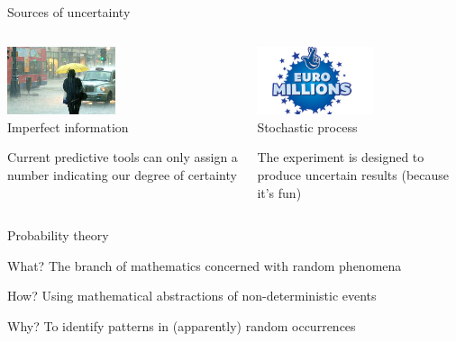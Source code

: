 \begin{frame}{Sources of uncertainty}
    \begin{columns}[t]
        \begin{column}{0.5\textwidth}
            \begin{center}
                \includegraphics[height=2cm]{figures/rain} \\[\medskipamount]
                \alert{Imperfect information}
            \end{center}
            Current predictive tools can only assign a number indicating our
            degree of certainty
        \end{column}
        \begin{column}{0.5\textwidth}
            \begin{center}
                \includegraphics[height=2cm]{figures/lottery} \\[\medskipamount]
                \alert{Stochastic process}
            \end{center}
            The experiment is designed to produce uncertain results (because
            it's fun)
        \end{column}
    \end{columns}
\end{frame}

\begin{frame}{Probability theory}
    \begin{block}{What?}
        The branch of mathematics concerned with \alert{random phenomena}
    \end{block}
    \vfill\pause
    \begin{block}{How?}
        Using mathematical \alert{abstractions} of non\hyp{}deterministic events
    \end{block}
    \vfill\pause
    \begin{block}{Why?}
        To identify \alert{patterns} in (apparently) random occurrences
    \end{block}
\end{frame}

